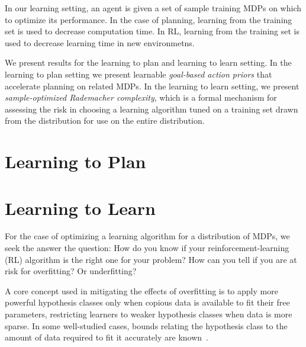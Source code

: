 In our learning setting, an agent is given a set of sample training MDPs on which to optimize its performance. In the case of planning, learning from the training set is used to decrease computation time. In RL, learning from the training set is used to decrease learning time in new environmetns.

We present results for the learning to plan and learning to learn setting. In the learning to plan setting we present learnable \emph{goal-based action priors} that accelerate planning on related MDPs. In the learning to learn setting, we present \emph{sample-optimized Rademacher complexity},
which is a formal mechanism for assessing the risk in choosing a learning algorithm tuned on a training set drawn from the distribution for use on the entire distribution.

\section{Learning to Plan}



\section{Learning to Learn}
For the case of optimizing a learning algorithm for a distribution of MDPs, we seek the answer the question: How do you know if your reinforcement-learning (RL) algorithm is the right one for your problem? How can you tell if you are at risk for overfitting? Or underfitting?


A core concept used in mitigating the effects of overfitting is to apply more powerful hypothesis classes only when copious data is available to fit their free parameters, restricting learners to weaker hypothesis classes when data is more sparse. In some well-studied cases, bounds relating the hypothesis class to the amount of data required to fit it accurately are known~\cite{blumer1989learnability}. 

